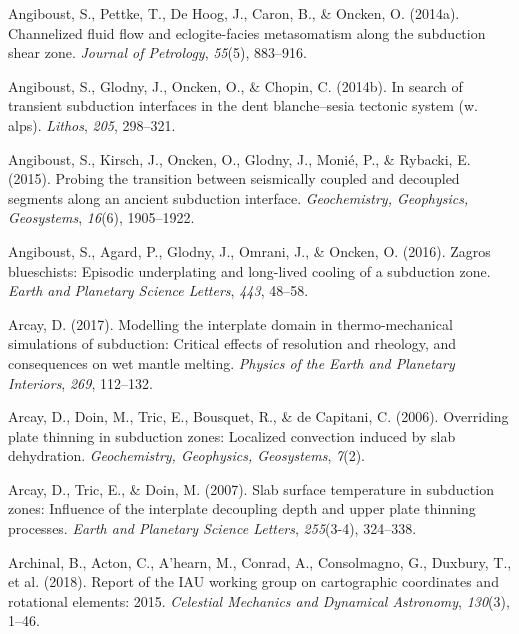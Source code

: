 \begin{CSLReferences}{1}{1}
\leavevmode{}%
Angiboust, S., Pettke, T., De Hoog, J., Caron, B., \& Oncken, O. (2014a). Channelized fluid flow and eclogite-facies metasomatism along the subduction shear zone. \emph{Journal of Petrology}, \emph{55}(5), 883--916.

\leavevmode{}%
Angiboust, S., Glodny, J., Oncken, O., \& Chopin, C. (2014b). In search of transient subduction interfaces in the dent blanche--sesia tectonic system (w. alps). \emph{Lithos}, \emph{205}, 298--321.

\leavevmode{}%
Angiboust, S., Kirsch, J., Oncken, O., Glodny, J., Monié, P., \& Rybacki, E. (2015). Probing the transition between seismically coupled and decoupled segments along an ancient subduction interface. \emph{Geochemistry, Geophysics, Geosystems}, \emph{16}(6), 1905--1922.

\leavevmode{}%
Angiboust, S., Agard, P., Glodny, J., Omrani, J., \& Oncken, O. (2016). Zagros blueschists: Episodic underplating and long-lived cooling of a subduction zone. \emph{Earth and Planetary Science Letters}, \emph{443}, 48--58.

\leavevmode{}%
Arcay, D. (2017). Modelling the interplate domain in thermo-mechanical simulations of subduction: Critical effects of resolution and rheology, and consequences on wet mantle melting. \emph{Physics of the Earth and Planetary Interiors}, \emph{269}, 112--132.

\leavevmode{}%
Arcay, D., Doin, M., Tric, E., Bousquet, R., \& de Capitani, C. (2006). Overriding plate thinning in subduction zones: Localized convection induced by slab dehydration. \emph{Geochemistry, Geophysics, Geosystems}, \emph{7}(2).

\leavevmode{}%
Arcay, D., Tric, E., \& Doin, M. (2007). Slab surface temperature in subduction zones: Influence of the interplate decoupling depth and upper plate thinning processes. \emph{Earth and Planetary Science Letters}, \emph{255}(3-4), 324--338.

\leavevmode{}%
Archinal, B., Acton, C., A'hearn, M., Conrad, A., Consolmagno, G., Duxbury, T., et al. (2018). Report of the IAU working group on cartographic coordinates and rotational elements: 2015. \emph{Celestial Mechanics and Dynamical Astronomy}, \emph{130}(3), 1--46.


\end{CSLReferences}

